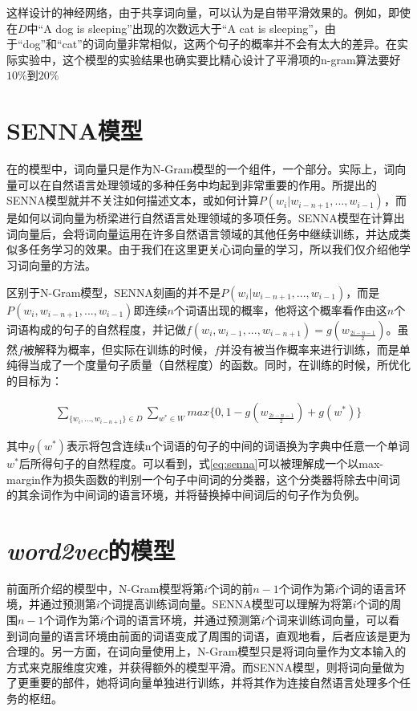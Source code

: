 这样设计的神经网络，由于共享词向量，可以认为是自带平滑效果的。例如，即使在$D$中``A dog is sleeping''出现的次数远大于``A cat is sleeping''，由于``dog''和``cat''的词向量非常相似，这两个句子的概率并不会有太大的差异。在实际实验中，这个模型的实验结果也确实要比精心设计了平滑项的n-gram算法要好$10\%$到$20\%$

\section{SENNA模型}
\label{sec:senna}
在\cite{bengio2006neural}的模型中，词向量只是作为N-Gram模型的一个组件，一个部分。实际上，词向量可以在自然语言处理领域的多种任务中均起到非常重要的作用。\cite{collobert2011natural}所提出的SENNA模型就并不关注如何描述文本，或如何计算$P(w_i|w_{i-n+1}, ..., w_{i-1})$，而是如何以词向量为桥梁进行自然语言处理领域的多项任务。SENNA模型在计算出词向量后，会将词向量运用在许多自然语言领域的其他任务中继续训练，并达成类似多任务学习的效果。由于我们在这里更关心词向量的学习，所以我们仅介绍他学习词向量的方法。

区别于N-Gram模型，SENNA刻画的并不是$P(w_i|w_{i-n+1}, ..., w_{i-1})$，而是$P(w_i, w_{i-n+1}, ..., w_{i-1})$即连续$n$个词语出现的概率，他将这个概率看作由这$n$个词语构成的句子的自然程度，并记做$f(w_i, w_{i-1}, ..., w_{i-n+1}) = g(w_{\frac{2i-n-1}{2}})$。虽然$f$被解释为概率，但实际在训练的时候，$f$并没有被当作概率来进行训练，而是单纯得当成了一个度量句子质量（自然程度）的函数。同时，在训练的时候，所优化的目标为：

\begin{eqnarray}
\label{eq:senna}
\sum_{\{w_i, ..., w_{i-n+1}\} \in D} \sum_{w^* \in W} max\{0, 1 - g(w_{\frac{2i-n-1}{2}}) + g(w^*) \}
\end{eqnarray}

其中$g(w^*)$表示将包含连续n个词语的句子的中间的词语换为字典中任意一个单词$w^*$后所得句子的自然程度。可以看到，式\ref{eq:senna}可以被理解成一个以max-margin作为损失函数的判别一个句子中间词的分类器，这个分类器将除去中间词的其余词作为中间词的语言环境，并将替换掉中间词后的句子作为负例。

\section{\emph{word2vec}的模型}

前面所介绍的模型中，N-Gram模型将第$i$个词的前$n-1$个词作为第$i$个词的语言环境，并通过预测第$i$个词提高训练词向量。SENNA模型可以理解为将第$i$个词的周围$n-1$个词作为第$i$个词的语言环境，并通过预测第$i$个词来训练词向量，可以看到词向量的语言环境由前面的词语变成了周围的词语，直观地看，后者应该是更为合理的。另一方面，在词向量使用上，N-Gram模型只是将词向量作为文本输入的方式来克服维度灾难，并获得额外的模型平滑。而SENNA模型，则将词向量做为了更重要的部件，她将词向量单独进行训练，并将其作为连接自然语言处理多个任务的枢纽。

